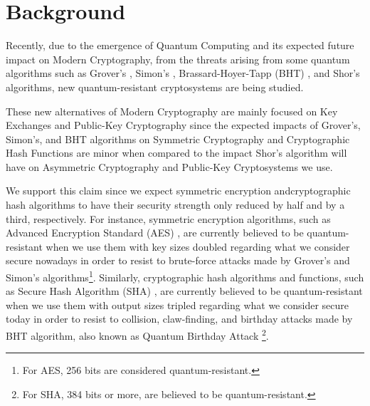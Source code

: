 \documentclass[runningheads]{llncs}
\numberwithin{equation}{section}
\begin{document}
    \section{Background}
    \label{sec:background}

    Recently, due to the emergence of Quantum Computing and its expected future impact on Modern Cryptography, from the threats arising from some quantum algorithms such as Grover's \cite{grover:fast-quantum-mechanical-algorithm-database-search:1996:06-2024}, Simon's \cite{simon:power-quantum-computation:1997:06-2024}, Brassard-Hoyer-Tapp (BHT) \cite{brassard-hoyer-tapp:quantum-cryptanalysis-hash-and-claw-free-functions:1998:06-2024}, and Shor's \cite{shor:algorithms-quantum-computation-discrete-logarithms-and-factoring:1994:06-2024,shor:polynomial-time-algorithms-prime-factorization-and-discrete-logarithms-quantum-computer:1997:06-2024} algorithms, new quantum-resistant cryptosystems are being studied.
    
    These new alternatives of Modern Cryptography are mainly focused on Key Exchanges and Public-Key Cryptography since the expected impacts of Grover's, Simon's, and BHT algorithms on Symmetric Cryptography and Cryptographic Hash Functions are minor when compared to the impact Shor's algorithm will have on Asymmetric Cryptography and Public-Key Cryptosystems we use.
    
    We support this claim since we expect symmetric encryption and\break cryptographic hash algorithms to have their security strength only reduced by half and by a third, respectively. For instance, symmetric encryption algorithms, such as Advanced Encryption Standard (AES) \cite{daemen-rijmen:block-cipher-rijndael:2000:06-2024}, are currently believed to be quantum-resistant when we use them with key sizes doubled regarding what we consider secure nowadays in order to resist to brute-force attacks made by Grover's and Simon's algorithms\footnote{For AES, 256 bits are considered quantum-resistant.}. Similarly, cryptographic hash algorithms and functions, such as Secure Hash Algorithm (SHA) \cite{dworkin:sha-3-standard-permutation-based-hash-and-extendable-output-functions:2015:06-2024}, are currently believed to be quantum-resistant when we use them with output sizes tripled regarding what we consider secure today in order to resist to collision, claw-finding, and birthday attacks made by BHT algorithm, also known as Quantum Birthday Attack \footnote{For SHA, 384 bits or more, are believed to be quantum-resistant.}.
\end{document}
